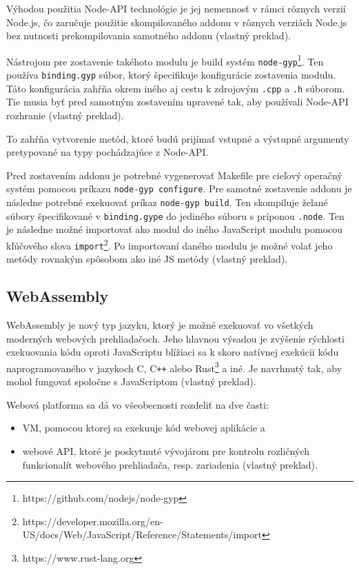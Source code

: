 Výhodou použitia Node-API technológie je jej nemennosť v rámci rôznych verzií Node.js, čo zaručuje použitie skompilovaného addonu v rôznych verziách Node.js bez nutnosti prekompilovania samotného addonu \cite{cpp_addons} (vlastný preklad).

Nástrojom pre zostavenie takéhoto modulu je build systém \texttt{node-gyp}\footnote{https://github.com/nodejs/node-gyp}. Ten používa \texttt{binding.gyp} súbor, ktorý špecifikuje konfigurácie zostavenia modulu. Táto konfigurácia zahŕňa okrem iného aj cestu k zdrojovým \texttt{.cpp} a \texttt{.h} súborom. Tie musia byť pred samotným zostavením upravené tak, aby používali Node-API rozhranie \cite{cpp_addons} (vlastný preklad).

To zahŕňa vytvorenie metód, ktoré budú prijímať vstupné a výstupné argumenty pretypované na typy pochádzajúce z Node-API.

Pred zostavením addonu je potrebné vygenerovať Makefile pre cieľový operačný systém pomocou príkazu \texttt{node-gyp configure}. Pre samotné zostavenie addonu je následne potrebné exekuovať príkaz \texttt{node-gyp build}. Ten skompiluje želané súbory špecifikované v \texttt{binding.gype} do jediného súboru s príponou \texttt{.node}. Ten je následne možné importovať ako modul do iného JavaScript modulu pomocou kľúčového slova \texttt{import}\footnote{https://developer.mozilla.org/en-US/docs/Web/JavaScript/Reference/Statements/import}. Po importovaní daného modulu je možné volať jeho metódy rovnakým spôsobom ako iné JS metódy \cite{cpp_addons} (vlastný preklad).

\subsection {WebAssembly}
WebAssembly je nový typ jazyku, ktorý je možné exekuovať vo všetkých moderných webových prehliadačoch. Jeho hlavnou výsadou je zvýšenie rýchlosti exekuovania kódu oproti JavaScriptu blížiaci sa k skoro natívnej exekúcii kódu naprogramovaného v jazykoch C, C\texttt{++} alebo Rust\footnote{https://www.rust-lang.org} a iné. Je navrhnutý tak, aby mohol fungovať spoločne s JavaScriptom \cite{webassembly_concepts} (vlastný preklad).

Webová platforma sa dá vo všeobecnosti rozdeliť na dve časti:
\begin{itemize}
\item {VM, pomocou ktorej sa exekuuje kód webovej aplikácie a}
\item {webové API, ktoré je poskytnuté vývojárom pre kontrolu rozličných funkcionalít webového prehliadača, resp. zariadenia  \cite{webassembly_concepts} (vlastný preklad).}
\end{itemize}

